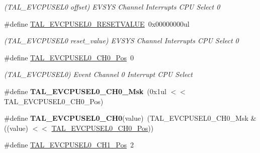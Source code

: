 \begin{DoxyCompactItemize}
\begin{DoxyCompactList}\small\item\em (T\+A\+L\+\_\+\+E\+V\+C\+P\+U\+S\+E\+L0 offset) E\+V\+S\+Y\+S Channel Interrupts C\+P\+U Select 0 \end{DoxyCompactList}\item 
\hypertarget{group___s_a_m_l21___t_a_l_ga2dc2ef0be911b1b7060d4feea1e91e0b}{}\#define \hyperlink{group___s_a_m_l21___t_a_l_ga2dc2ef0be911b1b7060d4feea1e91e0b}{T\+A\+L\+\_\+\+E\+V\+C\+P\+U\+S\+E\+L0\+\_\+\+R\+E\+S\+E\+T\+V\+A\+L\+U\+E}~0x00000000ul\label{group___s_a_m_l21___t_a_l_ga2dc2ef0be911b1b7060d4feea1e91e0b}

\begin{DoxyCompactList}\small\item\em (T\+A\+L\+\_\+\+E\+V\+C\+P\+U\+S\+E\+L0 reset\+\_\+value) E\+V\+S\+Y\+S Channel Interrupts C\+P\+U Select 0 \end{DoxyCompactList}\item 
\hypertarget{group___s_a_m_l21___t_a_l_gab4701843a7727bea7efd5199d177e115}{}\#define \hyperlink{group___s_a_m_l21___t_a_l_gab4701843a7727bea7efd5199d177e115}{T\+A\+L\+\_\+\+E\+V\+C\+P\+U\+S\+E\+L0\+\_\+\+C\+H0\+\_\+\+Pos}~0\label{group___s_a_m_l21___t_a_l_gab4701843a7727bea7efd5199d177e115}

\begin{DoxyCompactList}\small\item\em (T\+A\+L\+\_\+\+E\+V\+C\+P\+U\+S\+E\+L0) Event Channel 0 Interrupt C\+P\+U Select \end{DoxyCompactList}\item 
\hypertarget{group___s_a_m_l21___t_a_l_ga884a5947c9d165ac2c9fcedfa238d549}{}\#define {\bfseries T\+A\+L\+\_\+\+E\+V\+C\+P\+U\+S\+E\+L0\+\_\+\+C\+H0\+\_\+\+Msk}~(0x1ul $<$$<$ T\+A\+L\+\_\+\+E\+V\+C\+P\+U\+S\+E\+L0\+\_\+\+C\+H0\+\_\+\+Pos)\label{group___s_a_m_l21___t_a_l_ga884a5947c9d165ac2c9fcedfa238d549}

\item 
\hypertarget{group___s_a_m_l21___t_a_l_ga48f6159ce70f4fa7bf15a9bd89715a19}{}\#define {\bfseries T\+A\+L\+\_\+\+E\+V\+C\+P\+U\+S\+E\+L0\+\_\+\+C\+H0}(value)~(T\+A\+L\+\_\+\+E\+V\+C\+P\+U\+S\+E\+L0\+\_\+\+C\+H0\+\_\+\+Msk \& ((value) $<$$<$ \hyperlink{group___s_a_m_l21___t_a_l_gab4701843a7727bea7efd5199d177e115}{T\+A\+L\+\_\+\+E\+V\+C\+P\+U\+S\+E\+L0\+\_\+\+C\+H0\+\_\+\+Pos}))\label{group___s_a_m_l21___t_a_l_ga48f6159ce70f4fa7bf15a9bd89715a19}

\item 
\hypertarget{group___s_a_m_l21___t_a_l_ga8ce38fd8ecfd46bdbdd12ef79f7bca49}{}\#define \hyperlink{group___s_a_m_l21___t_a_l_ga8ce38fd8ecfd46bdbdd12ef79f7bca49}{T\+A\+L\+\_\+\+E\+V\+C\+P\+U\+S\+E\+L0\+\_\+\+C\+H1\+\_\+\+Pos}~2\label{group___s_a_m_l21___t_a_l_ga8ce38fd8ecfd46bdbdd12ef79f7bca49}


\end{DoxyCompactItemize}
